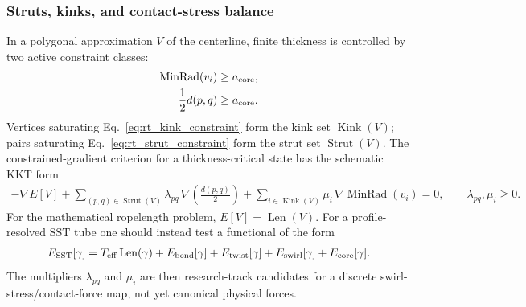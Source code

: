 \subsubsection{Struts, kinks, and contact-stress balance}
In a polygonal approximation $V$ of the centerline, finite thickness is
controlled by two active constraint classes:
\begin{align}
    \operatorname{MinRad}(v_i)&\ge a_{\rm core},
    \label{eq:rt_kink_constraint}\\
    \frac12 d(p,q)&\ge a_{\rm core}.
    \label{eq:rt_strut_constraint}
\end{align}
Vertices saturating Eq.~\eqref{eq:rt_kink_constraint} form the kink set
$\operatorname{Kink}(V)$; pairs saturating Eq.~\eqref{eq:rt_strut_constraint}
form the strut set $\operatorname{Strut}(V)$.  The constrained-gradient
criterion for a thickness-critical state has the schematic KKT form
\begin{align}
    -\nabla E[V]
    +
    \sum_{(p,q)\in\operatorname{Strut}(V)}
        \lambda_{pq}\,
        \nabla\!\left(\frac{d(p,q)}{2}\right)
    +
    \sum_{i\in\operatorname{Kink}(V)}
        \mu_i\,\nabla\operatorname{MinRad}(v_i)
    =0,
    \qquad
    \lambda_{pq},\mu_i\ge0 .
    \label{eq:rt_contact_kkt_balance}
\end{align}
For the mathematical ropelength problem, $E[V]=\operatorname{Len}(V)$.  For a
profile-resolved SST tube one should instead test a functional of the form
\begin{align}
    E_{\rm SST}[\gamma]
    =
    T_{\rm eff}\operatorname{Len}(\gamma)
    +E_{\rm bend}[\gamma]
    +E_{\rm twist}[\gamma]
    +E_{\rm swirl}[\gamma]
    +E_{\rm core}[\gamma] .
    \label{eq:rt_resolved_tube_energy}
\end{align}
The multipliers $\lambda_{pq}$ and $\mu_i$ are then research-track candidates
for a discrete swirl-stress/contact-force map, not yet canonical physical
forces.

